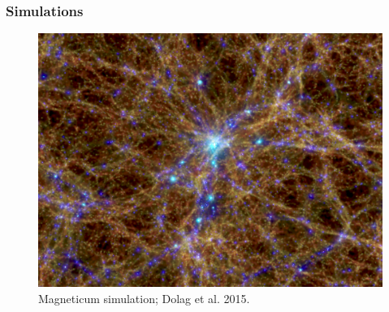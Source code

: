 \documentclass{beamer}
\makeatletter
\newcommand{\mylabel}{%
}
\makeatother
\begin{document}
\begin{frame}[plain,label=simulations]
    \frametitle{Simulations\mylabel}
    \begin{figure}
        \includegraphics[height=.8\textheight]{images/magneticum.png}
        \caption{Magneticum simulation; Dolag et al. 2015.}
    \end{figure}
\end{frame}
\end{document}
